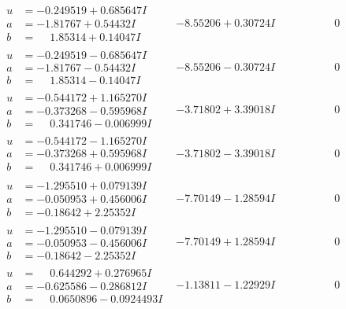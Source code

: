 \documentclass[1p]{elsarticle_modified}
\theoremstyle{definition}
\begin{document}
$$\begin{array}{c|c|c}
\begin{aligned}
u &= -0.249519 + 0.685647 I \\
a &= -1.81767 + 0.54432 I \\
b &= \phantom{-}1.85314 + 0.14047 I\end{aligned}
 & -8.55206 + 0.30724 I & \phantom{-0.000000 } 0 \\ \hline\begin{aligned}
u &= -0.249519 - 0.685647 I \\
a &= -1.81767 - 0.54432 I \\
b &= \phantom{-}1.85314 - 0.14047 I\end{aligned}
 & -8.55206 - 0.30724 I & \phantom{-0.000000 } 0 \\ \hline\begin{aligned}
u &= -0.544172 + 1.165270 I \\
a &= -0.373268 - 0.595968 I \\
b &= \phantom{-}0.341746 - 0.006999 I\end{aligned}
 & -3.71802 + 3.39018 I & \phantom{-0.000000 } 0 \\ \hline\begin{aligned}
u &= -0.544172 - 1.165270 I \\
a &= -0.373268 + 0.595968 I \\
b &= \phantom{-}0.341746 + 0.006999 I\end{aligned}
 & -3.71802 - 3.39018 I & \phantom{-0.000000 } 0 \\ \hline\begin{aligned}
u &= -1.295510 + 0.079139 I \\
a &= -0.050953 + 0.456006 I \\
b &= -0.18642 + 2.25352 I\end{aligned}
 & -7.70149 - 1.28594 I & \phantom{-0.000000 } 0 \\ \hline\begin{aligned}
u &= -1.295510 - 0.079139 I \\
a &= -0.050953 - 0.456006 I \\
b &= -0.18642 - 2.25352 I\end{aligned}
 & -7.70149 + 1.28594 I & \phantom{-0.000000 } 0 \\ \hline\begin{aligned}
u &= \phantom{-}0.644292 + 0.276965 I \\
a &= -0.625586 - 0.286812 I \\
b &= \phantom{-}0.0650896 - 0.0924493 I\end{aligned}
 & -1.13811 - 1.22929 I & \phantom{-0.000000 } 0 \\ \hline\begin{aligned}

\end{aligned}
\end{array}$$
\end{document}
